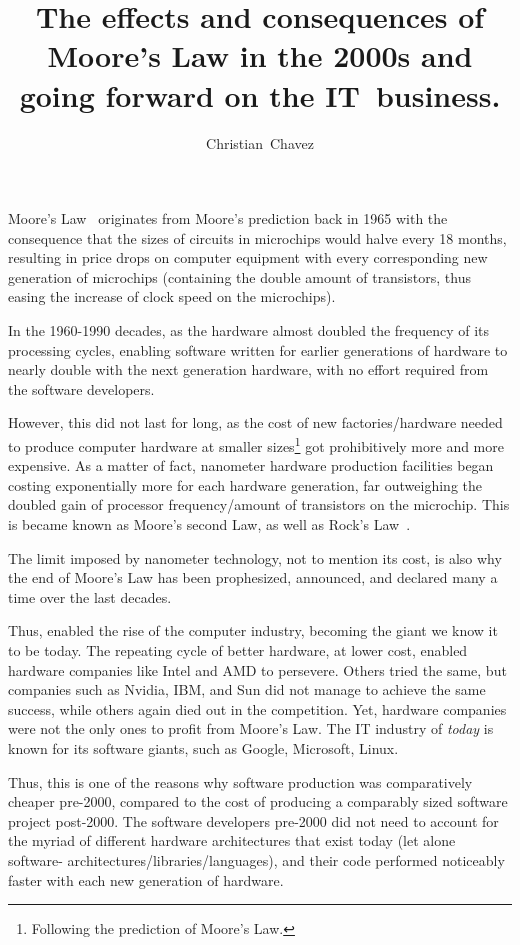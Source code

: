 \documentclass[a4paper,12pt]{article}
\begin{document}
\title{The effects and consequences of Moore's Law in the 2000s and going forward on the IT~business.}
\author{Christian~Chavez}

\maketitle

Moore's Law~\cite{Moore:2000:CMC:333067.333074} originates from Moore's prediction back in 1965 with the consequence that the sizes of circuits in microchips would halve every 18 months, resulting in price drops on computer equipment with every corresponding new generation of microchips (containing the double amount of transistors, thus easing the increase of clock speed on the microchips).

In the 1960-1990 decades, as the hardware almost doubled the frequency of its processing cycles, enabling software written for earlier generations of hardware to nearly double with the next generation hardware, with no effort required from the software developers.

However, this did not last for long, as the cost of new factories/hardware needed to produce computer hardware at smaller sizes\footnote{Following the prediction of Moore's Law.} got prohibitively more and more expensive. As a matter of fact, nanometer hardware production facilities began costing exponentially more for each hardware generation, far outweighing the doubled gain of processor frequency/amount of transistors on the microchip. This is became known as Moore's second Law, as well as Rock's Law~\cite{Ross:2003:EC:965307.965316}.

The limit imposed by nanometer technology, not to mention its cost, is also why the end of Moore's Law has been prophesized, announced, and declared many a time over the last decades.

Thus,  enabled the rise of the computer industry, becoming the giant we know it to be today.
The repeating cycle of better hardware, at lower cost, enabled hardware companies like Intel and AMD to persevere.
Others tried the same, but companies such as Nvidia, IBM, and Sun did not manage to achieve the same success, while others again died out in the competition.
Yet, hardware companies were not the only ones to profit from Moore's Law.
The IT industry of \emph{today} is known for its software giants, such as Google, Microsoft, Linux.

Thus, this is one of the reasons why software production was comparatively cheaper pre-2000, compared to the cost of producing a comparably sized software project post-2000.
The software developers pre-2000 did not need to account for the myriad of different hardware architectures that exist today (let alone software- architectures/libraries/languages), and their code performed noticeably faster with each new generation of hardware.
\end{document}
